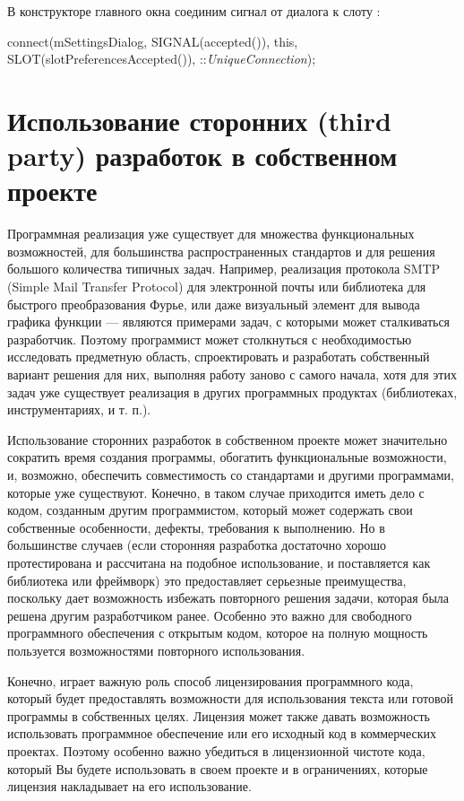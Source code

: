 В конструкторе главного окна соединим сигнал  от диалога к слоту
:

connect(mSettingsDialog, SIGNAL(accepted()), this, SLOT(slotPreferencesAccepted()), ::\textit{UniqueConnection});

\section[Использование сторонних (third party) разработок в собственном проекте]{Использование сторонних (third
party) разработок в собственном проекте}
Программная реализация уже существует для множества функциональных возможностей, для большинства распространенных
стандартов и для решения большого количества типичных задач. Например, реализация протокола SMTP (Simple Mail Transfer
Protocol) для электронной почты или библиотека для быстрого преобразования Фурье, или даже визуальный элемент для
вывода графика функции --- являются примерами задач, с которыми может сталкиваться разработчик. Поэтому программист может
столкнуться с необходимостью исследовать предметную область, спроектировать и разработать собственный вариант решения
для них, выполняя работу заново с самого начала, хотя для этих задач уже существует реализация в других программных
продуктах (библиотеках, инструментариях, и т. п.). 

Использование сторонних разработок в собственном проекте может значительно сократить время создания программы, обогатить
функциональные возможности, и, возможно, обеспечить совместимость со стандартами и другими программами, которые уже
существуют. Конечно, в таком случае приходится иметь дело с кодом, созданным другим программистом, который может
содержать свои собственные особенности, дефекты, требования к выполнению. Но в большинстве случаев (если сторонняя
разработка достаточно хорошо протестирована и рассчитана на подобное использование, и поставляется  как библиотека или
фреймворк) это предоставляет серьезные преимущества, поскольку дает возможность избежать повторного решения задачи,
которая была решена другим разработчиком ранее. Особенно это важно для свободного программного обеспечения с открытым
кодом, которое на полную мощность пользуется возможностями повторного использования. 

Конечно, играет важную роль способ лицензирования программного кода, который будет предоставлять возможности для
использования текста или готовой программы в собственных целях. Лицензия может также давать возможность использовать
программное обеспечение или его исходный код в коммерческих проектах. Поэтому особенно важно убедиться в лицензионной
чистоте кода, который Вы будете использовать в своем проекте и в ограничениях, которые лицензия накладывает на его
использование.

